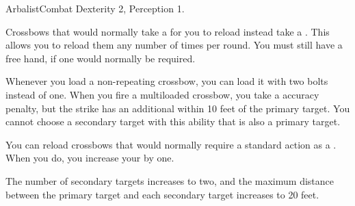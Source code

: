   \begin{feat}{Arbalist}{Combat}
    \featpre Dexterity 2, Perception 1.

     Crossbows that would normally take a  for you to reload instead take a .
    This allows you to reload them any number of times per round.
    You must still have a free hand, if one would normally be required.

     Whenever you load a non-repeating crossbow, you can load it with two bolts instead of one.
    When you fire a multiloaded crossbow, you take a  accuracy penalty, but the strike has an additional  within 10 feet of the primary target.
    You cannot choose a secondary target with this ability that is also a primary target.

     You can reload crossbows that would normally require a standard action as a .
    When you do, you increase your  by one.

     The number of secondary targets increases to two, and the maximum distance between the primary target and each secondary target increases to 20 feet.
  \end{feat}

